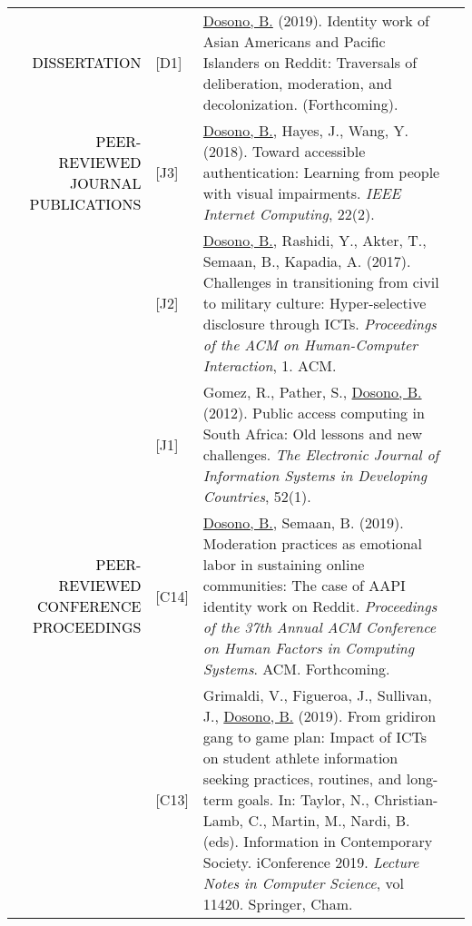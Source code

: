 \documentclass[12pt]{article}
\begin{document}
{{\begin{longtable}{Rp{1.0in}p{0.25in}p{4.75in}}
\textcolor{black}{\footnotesize{\uppercase{Dissertation}}} & \footnotesize{[D1]} &  \href{https://ischool.syr.edu/events/view/proposal-defense-bryan-dosono/}{{Dosono, B.}} (2019). Identity work of Asian Americans and Pacific Islanders on Reddit: Traversals of deliberation, moderation, and decolonization. (Forthcoming). \\

\textcolor{black}{\footnotesize{\uppercase{Peer-reviewed Journal Publications}}} & \footnotesize{[J3]} & \href{https://doi.org/10.1109/MIC.2018.112101619}{{Dosono, B.}}, Hayes, J., Wang, Y. (2018). Toward accessible authentication: Learning from people with visual impairments. \textit{IEEE Internet Computing}, 22(2). \\

& \footnotesize{[J2]} & \href{https://dl.acm.org/authorize?N42807}{{Dosono, B.}}, Rashidi, Y., Akter, T., Semaan, B., Kapadia, A. (2017). Challenges in transitioning from civil to military culture: Hyper-selective disclosure through ICTs. \textit{Proceedings of the ACM on Human-Computer Interaction}, 1. ACM. \\

& \footnotesize{[J1]} & Gomez, R., Pather, S., \href{https://doi.org/10.1002/j.1681-4835.2012.tb00366.x}{{Dosono, B.}} (2012). Public access computing in South Africa: Old lessons and new challenges. \textit{The Electronic Journal of Information Systems in Developing Countries}, 52(1). \\

\textcolor{black}{\footnotesize{\uppercase{Peer-reviewed Conference Proceedings}}} & \footnotesize{[C14]} & \href{https://chi2019.acm.org/}{{Dosono, B.}}, Semaan, B. (2019). Moderation practices as emotional labor in sustaining online communities: The case of AAPI identity work on Reddit. \textit{Proceedings of the 37th Annual ACM Conference on Human Factors in Computing Systems}. ACM. Forthcoming. \\

& \footnotesize{[C13]} & Grimaldi, V., Figueroa, J., Sullivan, J., \href{https://doi.org/10.1007/978-3-030-15742-5_29}{{Dosono, B.}} (2019). From gridiron gang to game plan: Impact of ICTs on student athlete information seeking practices, routines, and long-term goals. In: Taylor, N., Christian-Lamb, C., Martin, M., Nardi, B. (eds). Information in Contemporary Society. iConference 2019. \textit{Lecture Notes in Computer Science}, vol 11420. Springer, Cham. \\


\end{longtable}}}
\end{document}
